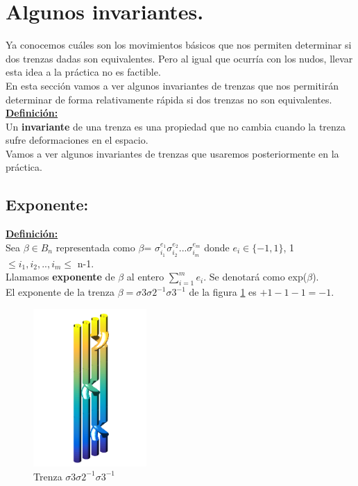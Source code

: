 \bigskip
\section{Algunos invariantes.}
Ya conocemos cuáles son los movimientos básicos que nos permiten determinar si dos trenzas dadas son equivalentes. Pero al igual que ocurría con los nudos, llevar esta idea a la práctica no es factible.\\

En esta sección vamos a ver algunos invariantes de trenzas que nos permitirán determinar de forma relativamente rápida si dos trenzas no son equivalentes.\\

\underline{\textbf{Definición:}} \\
Un \textbf{invariante} de una trenza es una propiedad que no cambia cuando la trenza sufre deformaciones en el espacio. \\

Vamos a ver algunos invariantes de trenzas que usaremos posteriormente en la práctica.

\bigskip
\subsection{Exponente:}\label{invtren1}
\textbf{\underline{Definición:}}\\
Sea $\beta \in B_{n}$ representada como $\beta $= $\sigma_{i_{1}}^{e_{1}} \sigma_{i_{2}}^{e_{2}} ... \sigma_{i_{m}}^{e_{m}}$ donde $e_{i} \in \{-1,1\}$, 1 $\le i_{1}, i_{2},..,i_{m} \le$ n-1.\\
Llamamos \textbf{exponente} de $\beta$ al entero $ \sum_{i=1}^{m} e_{i} $. Se denotará como exp($\beta$).\\

El exponente de la trenza $\beta = \sigma3\sigma2^{-1}\sigma3^{-1}$ de la figura \ref{exp1} es $+1-1-1=-1$.\\
   \begin{figure}[h!]
   	\centering
   	\includegraphics[width=4.3cm]{itrenzas/4c3.png}
   	\caption{Trenza $\sigma3\sigma2^{-1}\sigma3^{-1}$}
   	\label{exp1} 
   \end{figure}


